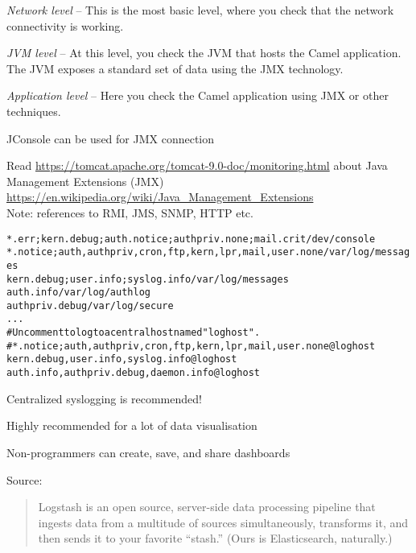 \documentclass[Screen16to9,17pt]{foils}
\begin{document}

\begin{list2}
\item \emph{Network level} -- This is the most basic level, where you check that the network connectivity is working.
\item \emph{JVM level} -- At this level, you check the JVM that hosts the Camel application. The JVM exposes a standard set of data using the JMX technology.
\item \emph{Application level} -- Here you check the Camel application using JMX or other
techniques.
\item JConsole can be used for JMX connection
\item Read \url{https://tomcat.apache.org/tomcat-9.0-doc/monitoring.html} about Java Management Extensions (JMX) \url{https://en.wikipedia.org/wiki/Java_Management_Extensions}\\
Note: references to RMI, JMS, SNMP, HTTP etc.
\end{list2}




\begin{alltt}
\small
*.err;kern.debug;auth.notice;authpriv.none;mail.crit    /dev/console
*.notice;auth,authpriv,cron,ftp,kern,lpr,mail,user.none /var/log/messages
kern.debug;user.info;syslog.info                        /var/log/messages
auth.info                                               /var/log/authlog
authpriv.debug                                          /var/log/secure
...
# Uncomment to log to a central host named "loghost".
#*.notice;auth,authpriv,cron,ftp,kern,lpr,mail,user.none        @loghost
kern.debug,user.info,syslog.info                               @loghost
auth.info,authpriv.debug,daemon.info                           @loghost
\end{alltt}
\vskip 1cm
\centerline{Centralized syslogging is recommended!}



\centerline{Highly recommended for a lot of data visualisation}

Non-programmers can create, save, and share dashboards

Source:




\begin{quote}
  Logstash is an open source, server-side data processing pipeline that ingests data from a multitude of sources simultaneously, transforms it, and then sends it
to your favorite “stash.” (Ours is Elasticsearch, naturally.)\\
\end{quote}
\end{document}
